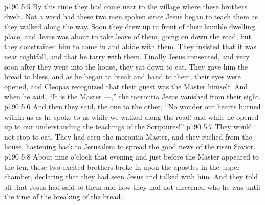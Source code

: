 \vs p190 5:5 By this time they had come near to the village where these brothers dwelt. Not a word had these two men spoken since Jesus began to teach them as they walked along the way. Soon they drew up in front of their humble dwelling place, and Jesus was about to take leave of them, going on down the road, but they constrained him to come in and abide with them. They insisted that it was near nightfall, and that he tarry with them. Finally Jesus consented, and very soon after they went into the house, they sat down to eat. They gave him the bread to bless, and as he began to break and hand to them, their eyes were opened, and Cleopas recognized that their guest was the Master himself. And when he said, “It is the Master ---,” the morontia Jesus vanished from their sight.
\vs p190 5:6 And then they said, the one to the other, “No wonder our hearts burned within us as he spoke to us while we walked along the road! and while he opened up to our understanding the teachings of the Scriptures!”
\vs p190 5:7 They would not stop to eat. They had seen the morontia Master, and they rushed from the house, hastening back to Jerusalem to spread the good news of the risen Savior.
\vs p190 5:8 About nine o’clock that evening and just before the Master appeared to the ten, these two excited brothers broke in upon the apostles in the upper chamber, declaring that they had seen Jesus and talked with him. And they told all that Jesus had said to them and how they had not discerned who he was until the time of the breaking of the bread.
